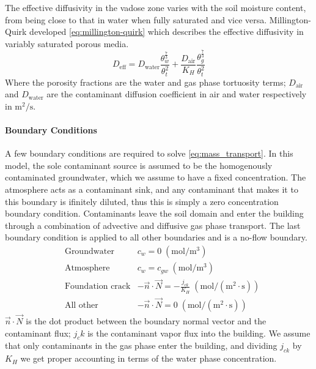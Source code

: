 The effective diffusivity in the vadose zone varies with the soil moisture content, from being close to that in water when fully saturated and vice versa.
Millington-Quirk developed \eqref{eq:millington-quirk} which describes the effective diffusivity in variably saturated porous media.
\begin{equation}\label{eq:millington-quirk}
  D_\mathrm{eff} = D_\mathrm{water} \frac{\theta_w^\frac{7}{3}}{\theta_t^2} + \frac{D_\mathrm{air}}{K_H} \frac{\theta_g^\frac{7}{3}}{\theta_t^2}
\end{equation}
Where the porosity fractions are the water and gas phase tortuosity terms;
$D_\mathrm{air}$ and $D_\mathrm{water}$ are the contaminant diffusion coefficient in air and water respectively in $\mathrm{m^2/s}$.\par

\paragraph{Boundary Conditions}

A few boundary conditions are required to solve \eqref{eq:mass_transport}.
In this model, the sole contaminant source is assumed to be the homogenously contaminated groundwater, which we assume to have a fixed concentration.
The atmosphere acts as a contaminant sink, and any contaminant that makes it to this boundary is ifinitely diluted, thus this is simply a zero concentration boundary condition.
Contaminants leave the soil domain and enter the building through a combination of advective and diffusive gas phase transport.
The last boundary condition is applied to all other boundaries and is a no-flow boundary.
\begin{align}
  &\text{Groundwater} & c_w = 0 \; \mathrm{(mol/m^3)} \\
  &\text{Atmosphere} & c_w = c_{gw} \; \mathrm{(mol/m^3)} \\
  &\text{Foundation crack} & -\vec{n} \cdot \vec{N} = - \frac{j_{ck}}{K_H} \; \mathrm{(mol/(m^2 \cdot s))}\\
  &\text{All other} & -\vec{n} \cdot \vec{N} = 0 \; \mathrm{(mol/(m^2 \cdot s))}
\end{align}
$\vec{n} \cdot \vec{N}$ is the dot product between the boundary normal vector and the contaminant flux;
$j_ck$ is the contaminant vapor flux into the building.
We assume that only contaminants in the gas phase enter the building, and dividing $j_{ck}$ by $K_H$ we get proper accounting in terms of the water phase concentration.\par

